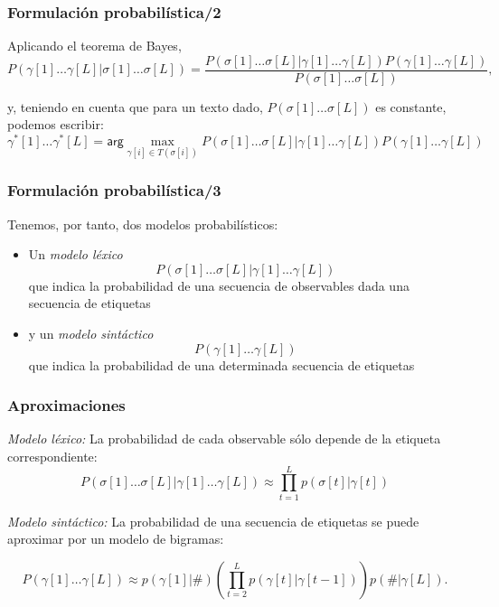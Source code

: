 \documentclass{beamer}
\begin{document}
\begin{frame}
\frametitle{ Formulación probabilística/2}

{
{Aplicando el teorema de Bayes,
{\small
\[
 P(\gamma[1]\ldots\gamma[L]|\sigma[1]\ldots\sigma[L])=
\frac{ P(\sigma[1]\ldots\sigma[L]|\gamma[1]\ldots\gamma[L])
 P(\gamma[1]\ldots\gamma[L])} {P(\sigma[1]\ldots\sigma[L])}
,\]
}
}

{y, teniendo en cuenta que para un texto dado,
  \(P(\sigma[1]\ldots\sigma[L])\) es constante, podemos escribir:
{\small
\[\gamma^*[1]\ldots\gamma^*[L]=\mathsf{arg}
 \max_{\gamma[i]\in T(\sigma[i])} P(\sigma[1]\ldots\sigma[L]|\gamma[1]\ldots\gamma[L])
 P(\gamma[1]\ldots\gamma[L])\]
}
}
}
\end{frame}
\begin{frame}
\frametitle{ Formulación probabilística/3}


Tenemos, por tanto, dos modelos probabilísticos:
\begin{itemize}
\item Un \emph{modelo léxico} 
\[ P(\sigma[1]\ldots\sigma[L]|\gamma[1]\ldots\gamma[L]) \]
que indica la probabilidad de una secuencia de observables dada una
secuencia de etiquetas

\item y un \emph{modelo sintáctico}
\[P(\gamma[1]\ldots\gamma[L])\]
que indica la probabilidad de una determinada secuencia de etiquetas
\end{itemize}


\end{frame}

\begin{frame}
\frametitle{ Aproximaciones}

{
{\emph{Modelo léxico:} La probabilidad de cada observable sólo depende de la etiqueta correspondiente:
\[P(\sigma[1]\ldots\sigma[L]|\gamma[1]\ldots\gamma[L])
\approx \prod_{t=1}^L p(\sigma[t]|\gamma[t]) \]
}
{\emph{Modelo sintáctico:} La probabilidad de una secuencia de etiquetas se puede aproximar por un modelo de bigramas:

\[P(\gamma[1]\ldots\gamma[L])\approx p(\gamma[1]|\#)\left(\prod_{t=2}^L
p(\gamma[t]|\gamma[t-1])\right) p(\#|\gamma[L]).\]}
}
\end{frame}

\end{document}
